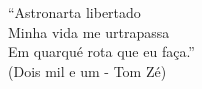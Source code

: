 \thispagestyle{plain}

\begin{flushright}
	\begin{minipage}[r]{6cm}
		\vspace{20cm}

		``Astronarta libertado\\
          Minha vida me urtrapassa\\
          Em quarqué rota que eu faça.''\\
		
		(Dois mil e um - Tom Zé)
		 
	\end{minipage}
\end{flushright}
